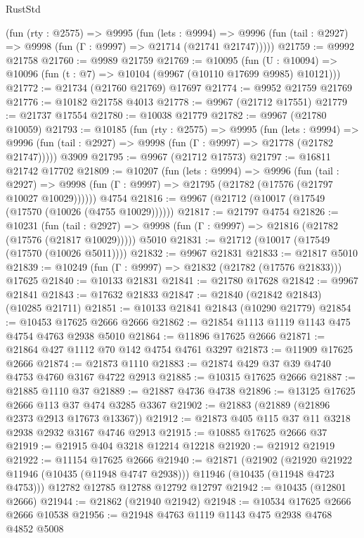 \begin{lexlean}{RustStd}
\begin{coremodule}
{\begin{coremodule}
{{{{{{{{{{{{{{{{{{{{{{{{{{{{{{{{{{{{{{{{{{{{{{{{{{{{{{{{{{{{{{{{{{{{{{{{{{{{{{    (fun (rty : @2575) =>
    @9995
      (fun (lets : @9994) =>
      @9996 (fun (tail : @2927) => @9998 (fun (Γ : @9997) => @21714 (@21741 @21747)))))
@21759 := @9992 @21758
@21760 := @9989 @21759
@21769 := @10095
    (fun (U : @10094) => @10096 (fun (t : @7) => @10104 (@9967 (@10110 @17699 @9985) @10121)))
@21772 := @21734 (@21760 @21769) @17697
@21774 := @9952 @21759 @21769
@21776 := @10182 @21758 @4013
@21778 := @9967 (@21712 @17551)
@21779 := @21737 @17554
@21780 := @10038 @21779
@21782 := @9967 (@21780 @10059)
@21793 := @10185
    (fun (rty : @2575) =>
    @9995
      (fun (lets : @9994) =>
      @9996 (fun (tail : @2927) => @9998 (fun (Γ : @9997) => @21778 (@21782 @21747)))))
    @3909
@21795 := @9967 (@21712 @17573)
@21797 := @16811 @21742 @17702
@21809 := @10207
    (fun (lets : @9994) =>
    @9996
      (fun (tail : @2927) =>
      @9998 (fun (Γ : @9997) => @21795 (@21782 (@17576 (@21797 @10027 @10029))))))
    @4754
@21816 := @9967 (@21712 (@10017 (@17549 (@17570 (@10026 (@4755 @10029))))))
@21817 := @21797 @4754
@21826 := @10231
    (fun (tail : @2927) => @9998 (fun (Γ : @9997) => @21816 (@21782 (@17576 (@21817 @10029)))))
    @5010
@21831 := @21712 (@10017 (@17549 (@17570 (@10026 @5011))))
@21832 := @9967 @21831
@21833 := @21817 @5010
@21839 := @10249 (fun (Γ : @9997) => @21832 (@21782 (@17576 @21833))) @17625
@21840 := @10133 @21831
@21841 := @21780 @17628
@21842 := @9967 @21841
@21843 := @17632 @21833
@21847 := @21840 (@21842 @21843) (@10285 @21711)
@21851 := @10133 @21841 @21843 (@10290 @21779)
@21854 := @10453 @17625 @2666 @2666
@21862 := @21854 @1113 @1119 @1143 @475 @4754 @4763 @2938 @5010
@21864 := @11896 @17625 @2666
@21871 := @21864 @427 @1112 @70 @142 @4754 @4761 @3297
@21873 := @11909 @17625 @2666
@21874 := @21873 @1110
@21883 := @21874 @429 @37 @39 @4740 @4753 @4760 @3167 @4722 @2913
@21885 := @10315 @17625 @2666
@21887 := @21885 @1110 @37
@21889 := @21887 @4736 @4738
@21896 := @13125 @17625 @2666 @113 @37 @474 @3285 @3367
@21902 := @21883 (@21889 (@21896 @2373 @2913 @17673 @13367))
@21912 := @21873 @405 @115 @37 @11 @3218 @2938 @2932 @3167 @4746 @2913
@21915 := @10885 @17625 @2666 @37
@21919 := @21915 @404 @3218 @12214 @12218
@21920 := @21912 @21919
@21922 := @11154 @17625 @2666
@21940 := @21871
    (@21902
      (@21920 @21922 @11946 (@10435 (@11948 @4747 @2938)))
      @11946
      (@10435 (@11948 @4723 @4753)))
    @12782
    @12785
    @12788
    @12792
    @12797
@21942 := @10435 (@12801 @2666)
@21944 := @21862 (@21940 @21942)
@21948 := @10534 @17625 @2666 @2666 @10538
@21956 := @21948 @4763 @1119 @1143 @475 @2938 @4768 @4852 @5008
}}}}}}}}}}}}}}}}}}}}}}}}}}}}}}}}}}}}}}}}}}}}}}}}}}}}}}}}}}}}}}}}}}}}}}}}}}}}}}
\end{coremodule}}
\end{coremodule}
\end{lexlean}
